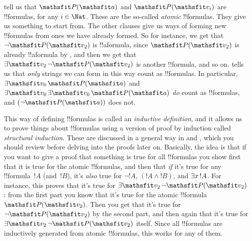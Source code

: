 \documentclass[../../../include/open-logic-section]{subfiles}
\begin{document}
 tell us that $\Atom{\Obj P}{\Obj a}$ and $\Atom{\Obj
P}{\Obj v_i}$ are !!{formula}s, for any $i \in \Nat$. These are
the so-called \emph{atomic} !!{formula}s. They give us something to
start from.  The other clauses give us ways of forming new
!!{formula}s from ones we have already formed. So for instance, we get
that $\lnot \Atom{\Obj P}{\Obj v_2}$ is !!a{formula}, since
$\Atom{\Obj P}{\Obj v_2}$ is already !!a{formula} by
, and then we get that $\lexists[\Obj v_2][\lnot
\Atom{\Obj P}{\Obj v_2}]$ is another !!{formula}, and so on.
 tells us that \emph{only} strings we can form in
this way count as !!{formula}s. In particular, $\lexists[\Obj
v_0][\Atom{\Obj P}{\Obj a}]$ and $\lexists[\Obj v_0][\lexists[\Obj
v_0][\Atom{\Obj P}{\Obj a}]]$ \emph{do} count as !!{formula}s, and
$(\lnot \Atom{\Obj P}{\Obj a})$ does not.

This way of defining !!{formula}s is called an \emph{inductive
definition}, and it allows us to prove things about !!{formula}s using
a version of proof by induction called \emph{structural induction}.
These are discussed in a general way in  and
, which you should review before delving
into the proofs later on. Basically, the idea is that if you want to
give a proof that something is true for all !!{formula}s you show
first that it is true for the atomic !!{formula}s, and then that
\emph{if} it's true for any !!{formula}~$!A$ (and~$!B$), it's
\emph{also} true for $\lnot !A$, $(!A \land !B)$, and
$\lexists[x][!A]$. For instance, this proves that it's true for
$\lexists[\Obj v_2][\lnot \Atom{\Obj P}{\Obj v_2}]$: from the first
part you know that it's true for the atomic !!{formula}~$\Atom{\Obj
P}{\Obj v_2}$. Then you get that it's true for $\lnot \Atom{\Obj
P}{\Obj v_2}$ by the second part, and then again that it's true for
$\lexists[\Obj v_2][\lnot \Atom{\Obj P}{\Obj v_2}]$ itself. Since all
!!{formula}s are inductively generated from atomic !!{formula}s, this
works for any of them.
\end{document}
